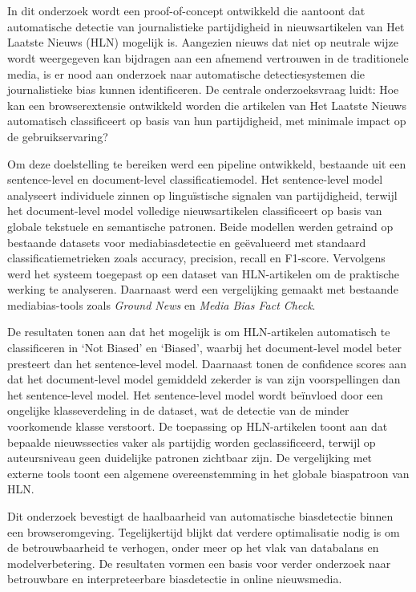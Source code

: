 \chapter*{}

In dit onderzoek wordt een proof-of-concept ontwikkeld die aantoont dat automatische detectie van journalistieke partijdigheid in nieuwsartikelen van Het Laatste Nieuws (HLN) mogelijk is. Aangezien nieuws dat niet op neutrale wijze wordt weergegeven kan bijdragen aan een afnemend vertrouwen in de traditionele media, is er nood aan onderzoek naar automatische detectiesystemen die journalistieke bias kunnen identificeren. De centrale onderzoeksvraag luidt: Hoe kan een browserextensie ontwikkeld worden die artikelen van Het Laatste Nieuws automatisch classificeert op basis van hun partijdigheid, met minimale impact op de gebruikservaring?

Om deze doelstelling te bereiken werd een pipeline ontwikkeld, bestaande uit een sentence-level en document-level classificatiemodel. Het sentence-level model analyseert individuele zinnen op linguïstische signalen van partijdigheid, terwijl het document-level model volledige nieuwsartikelen classificeert op basis van globale tekstuele en semantische patronen. Beide modellen werden getraind op bestaande datasets voor mediabiasdetectie en geëvalueerd met standaard classificatiemetrieken zoals accuracy, precision, recall en F1-score. Vervolgens werd het systeem toegepast op een dataset van HLN-artikelen om de praktische werking te analyseren. Daarnaast werd een vergelijking gemaakt met bestaande mediabias-tools zoals \textit{Ground News} en \textit{Media Bias Fact Check}.

De resultaten tonen aan dat het mogelijk is om HLN-artikelen automatisch te classificeren in `Not Biased' en `Biased', waarbij het document-level model beter presteert dan het sentence-level model. Daarnaast tonen de confidence scores aan dat het document-level model gemiddeld zekerder is van zijn voorspellingen dan het sentence-level model. Het sentence-level model wordt beïnvloed door een ongelijke klasseverdeling in de dataset, wat de detectie van de minder voorkomende klasse verstoort. De toepassing op HLN-artikelen toont aan dat bepaalde nieuwssecties vaker als partijdig worden geclassificeerd, terwijl op auteursniveau geen duidelijke patronen zichtbaar zijn. De vergelijking met externe tools toont een algemene overeenstemming in het globale biaspatroon van HLN.

Dit onderzoek bevestigt de haalbaarheid van automatische biasdetectie binnen een browseromgeving. Tegelijkertijd blijkt dat verdere optimalisatie nodig is om de betrouwbaarheid te verhogen, onder meer op het vlak van databalans en modelverbetering. De resultaten vormen een basis voor verder onderzoek naar betrouwbare en interpreteerbare biasdetectie in online nieuwsmedia.